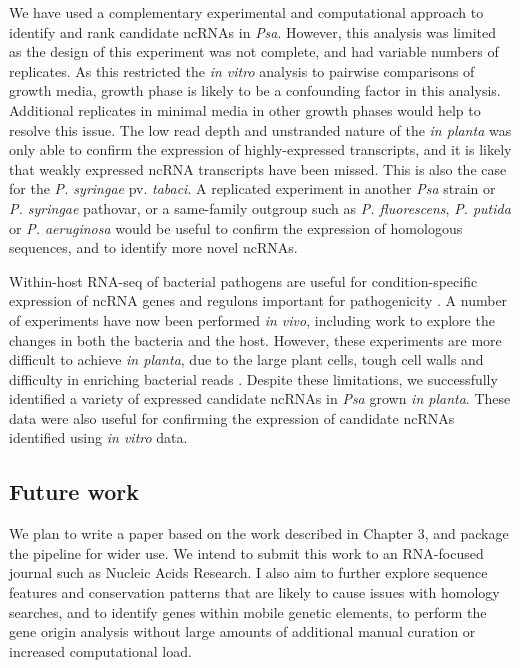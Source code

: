 We have used a complementary experimental and computational approach to identify and rank candidate ncRNAs in \textit{Psa}. However, this analysis was limited as the design of this experiment was not complete, and had variable numbers of replicates. As this restricted the \textit{in vitro} analysis to pairwise comparisons of growth media, growth phase is likely to be a confounding factor in this analysis. Additional replicates in minimal media in other growth phases would help to resolve this issue. The low read depth and unstranded nature of the \textit{in planta} was only able to confirm the expression of highly-expressed transcripts, and it is likely that weakly expressed ncRNA transcripts have been missed. This is also the case for the \textit{P. syringae} pv. \textit{tabaci}. A replicated experiment in another \textit{Psa} strain or \textit{P. syringae} pathovar, or a same-family outgroup such as \textit{P. fluorescens}, \textit{P. putida} or \textit{P. aeruginosa} would be useful to confirm the expression of homologous sequences, and to identify more novel ncRNAs.

Within-host RNA-seq of bacterial pathogens are useful for condition-specific expression of ncRNA genes and regulons important for pathogenicity \citep{Westermann2016-mxr}. A number of experiments have now been performed \textit{in vivo}, including work to explore the changes in both the bacteria and the host. However, these experiments are more difficult to achieve \textit{in planta}, due to the large plant cells, tough cell walls and difficulty in enriching bacterial reads \citep{Nobori2018-ux}. Despite these limitations, we successfully identified a variety of expressed candidate ncRNAs in \textit{Psa} grown \textit{in planta}. These data were also useful for confirming the expression of candidate ncRNAs identified using \textit{in vitro} data.


\subsection{Future work}

We plan to write a paper based on the work described in Chapter 3, and package the pipeline for wider use. We intend to submit this work to an RNA-focused journal such as Nucleic Acids Research. I also aim to further explore sequence features and conservation patterns that are likely to cause issues with homology searches, and to identify genes within mobile genetic elements, to perform the gene origin analysis without large amounts of additional manual curation or increased computational load.

